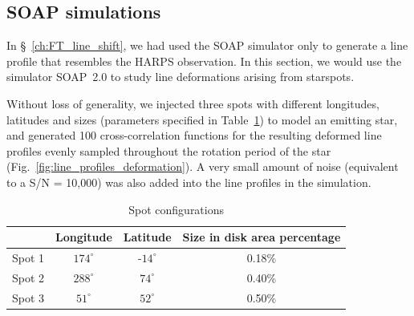
\subsection{SOAP simulations}
\label{sec:Simulations}

In \S~\ref{ch:FT_line_shift}, we had used the SOAP simulator only to generate a line profile that resembles the HARPS observation. In this section, we would use the simulator SOAP~2.0 to study line deformations arising from starspots. 

Without loss of generality, we injected three spots with different longitudes, latitudes and sizes (parameters specified in Table~\ref{table:spot_configurations}) to model an emitting star, and generated 100 cross-correlation functions for the resulting  deformed line profiles evenly sampled throughout the rotation period of the star (Fig.~\ref{fig:line_profiles_deformation}). A very small amount of noise (equivalent to a S/N = 10,000) was also added into the line profiles in the simulation. 

\begin{table}[htbp]
\centering
\begin{tabular}{|c|c|c|c|}
\hline 
 & Longitude & Latitude & Size in disk area percentage\\ 
\hline 
Spot 1 & $174^\circ$ & -$14^\circ$ & 0.18\% \\ 
\hline 
Spot 2 & $288^\circ$ & $74^\circ$  & 0.40\% \\ 
\hline 
Spot 3 & $51^\circ$  & $52^\circ$  & 0.50\% \\ 
\hline 
\end{tabular} 
\caption{Spot configurations}
\label{table:spot_configurations}
\end{table}

